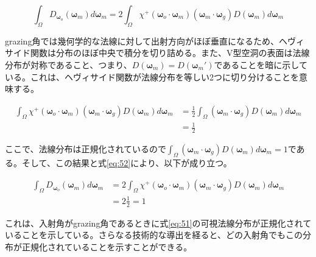 \documentclass[a4j,xelatex,ja=standard]{bxjsarticle}
\begin{document}
\begin{equation}
    \int_{\Omega} D_{\boldsymbol{\omega}_o}(\boldsymbol{\omega}_m) d\boldsymbol{\omega}_m = 2 \int_{\Omega} \chi^+(\boldsymbol{\omega}_o \cdot \boldsymbol{\omega}_m) (\boldsymbol{\omega}_m \cdot \boldsymbol{\omega}_g) D(\boldsymbol{\omega}_m) d\boldsymbol{\omega}_m
    \label{eq:52}
\end{equation}

grazing角では幾何学的な法線に対して出射方向がほぼ垂直になるため、ヘヴィサイド関数は分布のほぼ中央で積分を切り詰める。また、V型空洞の表面は法線分布が対称であること、つまり、$D(\boldsymbol{\omega}_m) = D(\boldsymbol{\omega}_m')$であることを暗に示している。これは、ヘヴィサイド関数が法線分布を等しい2つに切り分けることを意味する。

\begin{equation}
    \begin{split}
        \int_{\Omega} \chi^+(\boldsymbol{\omega}_o \cdot \boldsymbol{\omega}_m) (\boldsymbol{\omega}_m \cdot \boldsymbol{\omega}_g) D(\boldsymbol{\omega}_m) d\boldsymbol{\omega}_m
        &= \frac{1}{2} \int_{\Omega} (\boldsymbol{\omega}_m \cdot \boldsymbol{\omega}_g) D(\boldsymbol{\omega}_m) d\boldsymbol{\omega}_m \\
        &= \frac{1}{2}
    \end{split}
    \label{eq:53}
\end{equation}

ここで、法線分布は正規化されているので$\int_{\Omega} (\boldsymbol{\omega}_m \cdot \boldsymbol{\omega}_g) D(\boldsymbol{\omega}_m) d\boldsymbol{\omega}_m = 1$である。そして、この結果と式\eqref{eq:52}により、以下が成り立つ。

\begin{equation}
    \begin{split}
        \int_{\Omega} D_{\boldsymbol{\omega}_o}(\boldsymbol{\omega}_m) d\boldsymbol{\omega}_m
        &= 2 \int_{\Omega} \chi^+(\boldsymbol{\omega}_o \cdot \boldsymbol{\omega}_m) (\boldsymbol{\omega}_m \cdot \boldsymbol{\omega}_g) D(\boldsymbol{\omega}_m) d\boldsymbol{\omega}_m \\
        &= 2 \frac{1}{2} = 1
    \end{split}
    \label{eq:54}
\end{equation}

これは、入射角がgrazing角であるときに式\eqref{eq:51}の可視法線分布が正規化されていることを示している。さらなる技術的な導出を経ると、どの入射角でもこの分布が正規化されていることを示すことができる。
\end{document}

